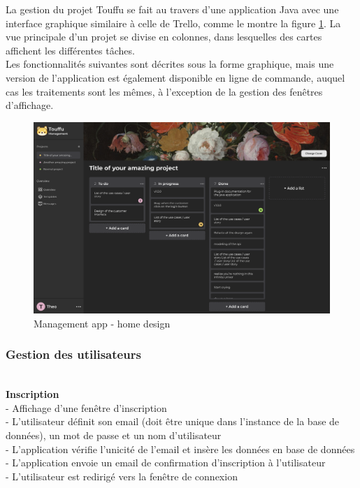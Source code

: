 \documentclass[conference]{IEEEtran}
\begin{document}
La gestion du projet Touffu se fait au travers d'une application Java avec une interface graphique similaire à celle de Trello, comme le montre la figure \ref{fig:touffumanagementhomedesign}. La vue principale d'un projet se divise en colonnes, dans lesquelles des cartes affichent les différentes tâches.\\
Les fonctionnalités suivantes sont décrites sous la forme graphique, mais une version de l'application est également disponible en ligne de commande, auquel cas les traitements sont les mêmes, à l'exception de la gestion des fenêtres d'affichage.

\begin{figure}[h]
	\centering
	\includegraphics[width=\columnwidth]{Ressources/Images/Touffu-management-home}
	\caption{Management app - home design}
	\label{fig:touffumanagementhomedesign}
\end{figure}

\subsubsection{Gestion des utilisateurs}\hfil\\

\textbf{Inscription}\\
- Affichage d'une fenêtre d'inscription\\
- L'utilisateur définit son email (doit être unique dans l'instance de la base de données), un mot de passe et un nom d'utilisateur\\
- L'application vérifie l'unicité de l'email et insère les données en base de données\\
- L'application envoie un email de confirmation d'inscription à l'utilisateur\\
- L'utilisateur est redirigé vers la fenêtre de connexion\\
\end{document}
